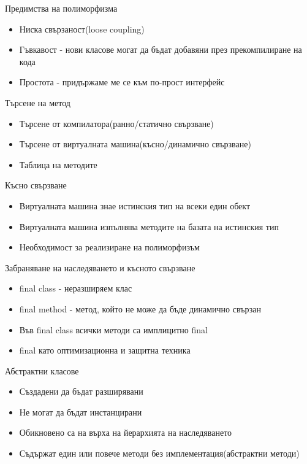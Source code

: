 \documentclass{beamer}
\begin{document}
\begin{frame}{Предимства на полиморфизма}
  \transdissolve
  \begin{itemize}
  \item Ниска свързаност(loose coupling)
  \item Гъвкавост - нови класове могат да бъдат добавяни през
    прекомпилиране на кода
  \item Простота - придържаме ме се към по-прост интерфейс
  \end{itemize}
\end{frame}

\begin{frame}{Търсене на метод}
  \transdissolve
  \begin{itemize}
  \item Търсене от компилатора(ранно/статично свързване)
  \item Търсене от виртуалната машина(късно/динамично свързване)
  \item Таблица на методите
  \end{itemize}
\end{frame}

\begin{frame}{Късно свързване}
  \transdissolve
  \begin{itemize}
  \item Виртуалната машина знае истинския тип на всеки един обект
  \item Виртуалната машина изпълнява методите на базата на истинския
    тип
  \item Необходимост за реализиране на полиморфизъм
  \end{itemize}
\end{frame}

\begin{frame}{Забраняване на наследяването и късното свързване}
  \transdissolve
  \begin{itemize}
  \item final class - неразширяем клас
  \item final method - метод, който не може да бъде динамично свързан
  \item Във final class всички методи са имплицитно final
  \item final като оптимизационна и защитна техника
  \end{itemize}
\end{frame}

\begin{frame}{Абстрактни класове}
  \transdissolve
  \begin{itemize}
  \item Създадени да бъдат разширявани
  \item Не могат да бъдат инстанцирани
  \item Обикновено са на върха на йерархията на наследяването
  \item Съдържат един или повече методи без имплементация(абстрактни методи)
  \end{itemize}
\end{frame}
\end{document}
